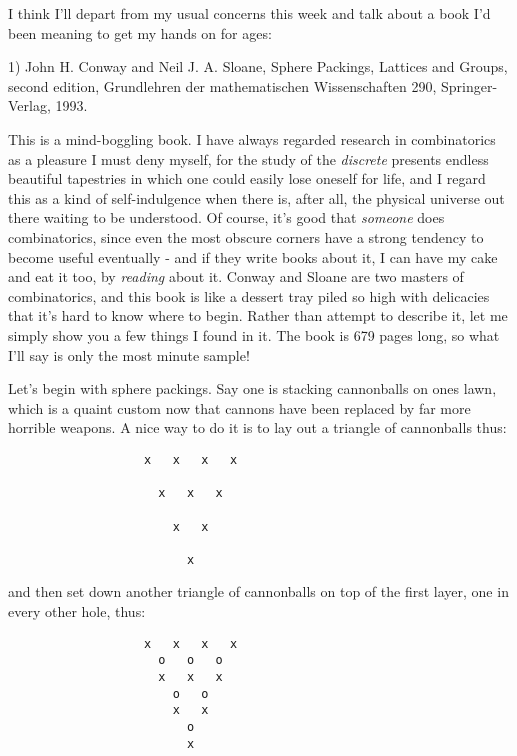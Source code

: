

I think I'll depart from my usual concerns this week and talk about a
book I'd been meaning to get my hands on for ages:

1) John H. Conway and Neil J. A. Sloane, Sphere Packings, Lattices and
Groups, second edition, Grundlehren der mathematischen Wissenschaften
290, Springer-Verlag, 1993.


This is a mind-boggling book.  I have always regarded research in
combinatorics as a pleasure I must deny myself, for the study
of the \emph{discrete} presents endless beautiful tapestries in which one
could easily lose oneself for life, and I regard this as a kind of
self-indulgence when there is, after all, the physical universe out
there waiting to be understood.  Of course, it's good that \emph{someone}
does combinatorics, since even the most obscure corners have a strong
tendency to become useful eventually - and if they write books about it,
I can have my cake and eat it too, by \emph{reading} about it.  Conway and
Sloane are two masters of combinatorics, and this book is like a dessert
tray piled so high with delicacies that it's hard to know where to
begin.  Rather than attempt to describe it, let me simply show you a few
things I found in it.  The book is 679 pages long, so what I'll say is
only the most minute sample!

Let's begin with sphere packings.  Say one is stacking cannonballs on
ones lawn, which is a quaint custom now that cannons have been replaced
by far more horrible weapons.  A nice way to do it is to lay out a
triangle of cannonballs thus:
 
\begin{verbatim}
                   x   x   x   x

                     x   x   x

                       x   x

                         x

\end{verbatim}
    

and then set down another triangle of cannonballs on top of the first
layer, one in every other hole, thus:

 
\begin{verbatim}
                   x   x   x   x
                     o   o   o
                     x   x   x
                       o   o
                       x   x
                         o
                         x

\end{verbatim}
    

